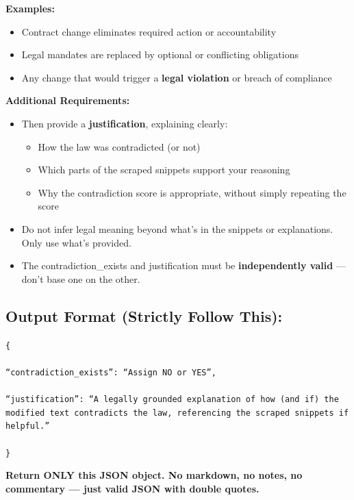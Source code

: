 \documentclass[11pt]{article}
\begin{document}
\begin{tcolorbox}[breakable,colback=lightestgray,colframe=black,title=\textbf{Legal LLM Validation Prompt}]
\textbf{Examples:}
\begin{itemize}
    \item Contract change eliminates required action or accountability
    \item Legal mandates are replaced by optional or conflicting obligations
    \item Any change that would trigger a \textbf{legal violation} or breach of compliance
\end{itemize}

\textbf{Additional Requirements:}
\begin{itemize}
    \item Then provide a \textbf{justification}, explaining clearly:
    \begin{itemize}
        \item How the law was contradicted (or not)
        \item Which parts of the scraped snippets support your reasoning
        \item Why the contradiction score is appropriate, without simply repeating the score
    \end{itemize}
    \item Do not infer legal meaning beyond what's in the snippets or explanations. Only use what's provided.
    \item The contradiction\_exists and justification must be \textbf{independently valid} — don't base one on the other.
\end{itemize}

\subsection*{\textbf{Output Format (Strictly Follow This):}}

{\small
\texttt{\{\\\\
``contradiction\_exists'': ``Assign NO or YES'',\\\\
``justification'': ``A legally grounded explanation of how (and if) the modified text contradicts the law, referencing the scraped snippets if helpful.''\\\\
\}}
}

\textbf{Return ONLY this JSON object. No markdown, no notes, no commentary — just valid JSON with double quotes.}
\end{tcolorbox}
\end{document}
